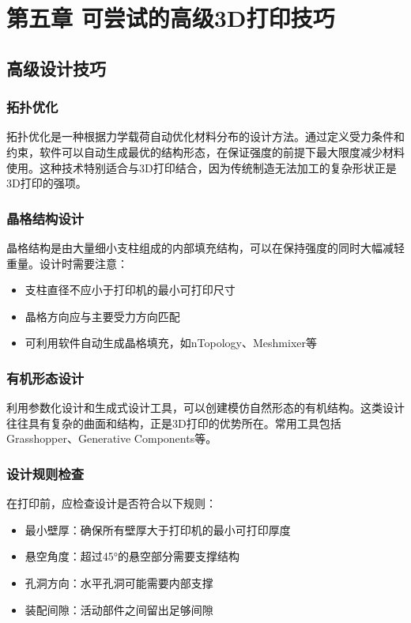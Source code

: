 \documentclass[12pt,UTF8]{ctexbook}
\begin{document}
\chapter{第五章 可尝试的高级3D打印技巧}

\section{高级设计技巧}

\subsection{拓扑优化}
拓扑优化是一种根据力学载荷自动优化材料分布的设计方法。通过定义受力条件和约束，软件可以自动生成最优的结构形态，在保证强度的前提下最大限度减少材料使用。这种技术特别适合与3D打印结合，因为传统制造无法加工的复杂形状正是3D打印的强项。

\subsection{晶格结构设计}
晶格结构是由大量细小支柱组成的内部填充结构，可以在保持强度的同时大幅减轻重量。设计时需要注意：
\begin{itemize}
\item 支柱直径不应小于打印机的最小可打印尺寸
\item 晶格方向应与主要受力方向匹配
\item 可利用软件自动生成晶格填充，如nTopology、Meshmixer等
\end{itemize}

\subsection{有机形态设计}
利用参数化设计和生成式设计工具，可以创建模仿自然形态的有机结构。这类设计往往具有复杂的曲面和结构，正是3D打印的优势所在。常用工具包括Grasshopper、Generative Components等。

\subsection{设计规则检查}
在打印前，应检查设计是否符合以下规则：
\begin{itemize}
\item 最小壁厚：确保所有壁厚大于打印机的最小可打印厚度
\item 悬空角度：超过45°的悬空部分需要支撑结构
\item 孔洞方向：水平孔洞可能需要内部支撑
\item 装配间隙：活动部件之间留出足够间隙
\end{itemize}
\end{document}
